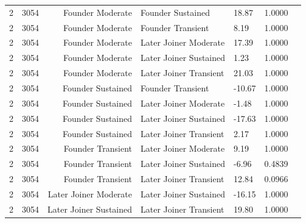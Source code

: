 \begin{table}[H]
\begin{tabular}{l r r l l r r}
2 & 3054 & Founder Moderate & Founder Sustained & 18.87 & 1.0000 \\ 
2 & 3054 & Founder Moderate & Founder Transient & 8.19 & 1.0000 \\ 
2 & 3054 & Founder Moderate & Later Joiner Moderate & 17.39 & 1.0000 \\ 
2 & 3054 & Founder Moderate & Later Joiner Sustained & 1.23 & 1.0000 \\ 
2 & 3054 & Founder Moderate & Later Joiner Transient & 21.03 & 1.0000 \\ 
2 & 3054 & Founder Sustained & Founder Transient & -10.67 & 1.0000 \\ 
2 & 3054 & Founder Sustained & Later Joiner Moderate & -1.48 & 1.0000 \\ 
2 & 3054 & Founder Sustained & Later Joiner Sustained & -17.63 & 1.0000 \\ 
2 & 3054 & Founder Sustained & Later Joiner Transient & 2.17 & 1.0000 \\ 
2 & 3054 & Founder Transient & Later Joiner Moderate & 9.19 & 1.0000 \\ 
2 & 3054 & Founder Transient & Later Joiner Sustained & -6.96 & 0.4839 \\ 
2 & 3054 & Founder Transient & Later Joiner Transient & 12.84 & 0.0966 \\ 
2 & 3054 & Later Joiner Moderate & Later Joiner Sustained & -16.15 & 1.0000 \\ 
2 & 3054 & Later Joiner Sustained & Later Joiner Transient & 19.80 & 1.0000 \\ 
\bottomrule
\end{tabular}%
\label{tab:codebase_graph_latex_repository_graph_component_time_series_holm_bonferroni_no_sig_one_and_twomethods} 
\end{table}
\newpage 
